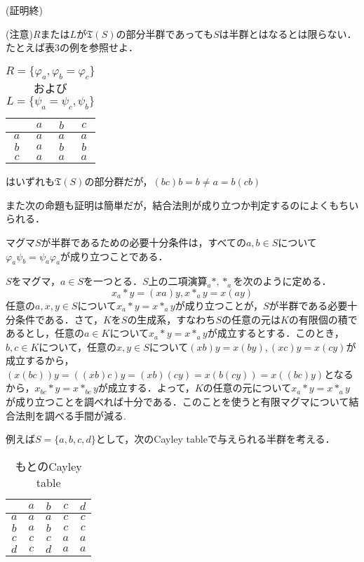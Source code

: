\begin{flushright}(証明終)\end{flushright}
(注意)$R$または$L$が${\mathfrak T}(S)$の部分半群であっても$S$は半群とはなるとは限らない．たとえば表3の例を参照せよ．
\begin{table}[htb]
\begin{center}
\begin{tabular}{c|ccc}
     &$a$&$b$&$c$ \\ \hline
$a$&$a$&$a$&$a$ \\
$b$&$a$&$b$&$b$ \\
$c$&$a$&$a$&$a$
\end{tabular}
\caption{$R=\{\varphi_a,\varphi_b=\varphi_c\}$および$L=\{\psi_a=\psi_c,\psi_b\}$}はいずれも${\mathfrak T}(S)$の部分群だが，$(bc)b=b\neq a=b(cb)$
\end{center}
\end{table}
また次の命題も証明は簡単だが，結合法則が成り立つか判定するのによくもちいられる．
\begin{sprop}
マグマ$S$が半群であるための必要十分条件は，すべての$a,b\in S$について$\varphi_a\psi_b=\psi_a\varphi_a$が成り立つことである．
\end{sprop}
$S$をマグマ，$a\in S$を一つとる．$S$上の二項演算$_{a}*,*_{a}$を次のように定める．
$$
x_{a}*y=(xa)y, x*_{a}y=x(ay)
$$
任意の$a,x,y\in S$について$x_{a}*y=x*_{a}y$が成り立つことが，$S$が半群である必要十分条件である．さて，$K$を$S$の生成系，すなわち$S$の任意の元は$K$の有限個の積であるとし，任意の$a\in K$について$x_{a}*y=x*_{a}y$が成立するとする．このとき，$b,c\in K$について，任意の$x,y\in S$について$(xb)y=x(by), (xc)y=x(cy)$が成立するから，$(x(bc))y=((xb)c)y=(xb)(cy)=x(b(cy))=x((bc)y)$となるから，$x_{bc}*y=x*_{bc}y$が成立する．よって，$K$の任意の元について$x_{a}*y=x*_{a}y$が成り立つことを調べれば十分である．このことを使うと有限マグマについて結合法則を調べる手間が減る.
\par
例えば$S=\{a,b,c,d\}$として，次のCayley tableで与えられる半群を考える．
\begin{table}[htb]
\begin{center}
\begin{tabular}{c|cccc}
     &$a$&$b$&$c$&$d$ \\ \hline
$a$&$a$&$a$&$c$&$c$ \\
$b$&$a$&$b$&$c$&$c$ \\
$c$&$c$&$c$&$a$&$a$ \\
$d$&$c$&$d$&$a$&$a$  
\end{tabular}
\caption{もとのCayley table}
\end{center}
\end{table}
